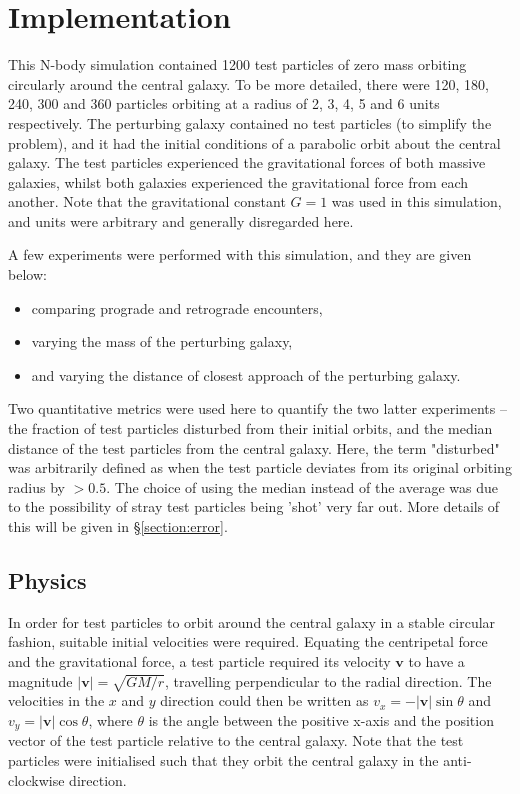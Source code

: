 \documentclass[twoside,twocolumn]{article}
\begin{document}
\section{Implementation}
    \label{section:implementation}

    This N-body simulation contained 1200 test particles of zero mass orbiting circularly around the central galaxy. To be more detailed, there were 120, 180, 240, 300 and 360 particles orbiting at a radius of 2, 3, 4, 5 and 6 units respectively. The perturbing galaxy contained no test particles (to simplify the problem), and it had the initial conditions of a parabolic orbit about the central galaxy. The test particles experienced the gravitational forces of both massive galaxies, whilst both galaxies experienced the gravitational force from each another. Note that the gravitational constant $G = 1$ was used in this simulation, and units were arbitrary and generally disregarded here.

    A few experiments were performed with this simulation, and they are given below:
    \begin{itemize}
        \item comparing prograde and retrograde encounters,
        \item varying the mass of the perturbing galaxy,
        \item and varying the distance of closest approach of the perturbing galaxy.
    \end{itemize}
    Two quantitative metrics were used here to quantify the two latter experiments -- the fraction of test particles disturbed from their initial orbits, and the median distance of the test particles from the central galaxy. Here, the term "disturbed" was arbitrarily defined as when the test particle deviates from its original orbiting radius by $>0.5$. The choice of using the median instead of the average was due to the possibility of stray test particles being 'shot' very far out. More details of this will be given in \S \ref{section:error}.

    \subsection{Physics}
        \label{section:physics}

        In order for test particles to orbit around the central galaxy in a stable circular fashion, suitable initial velocities were required. Equating the centripetal force and the gravitational force, a test particle required its velocity $\bm{v}$ to have a magnitude $\lvert\bm{v}\lvert = \sqrt{GM/r}$, travelling perpendicular to the radial direction. The velocities in the $x$ and $y$ direction could then be written as $v_x = - \lvert\bm{v}\lvert \sin{\theta}$ and $v_y = \lvert\bm{v}\lvert \cos{\theta}$, where $\theta$ is the angle between the positive x-axis and the position vector of the test particle relative to the central galaxy. Note that the test particles were initialised such that they orbit the central galaxy in the anti-clockwise direction.
\end{document}
